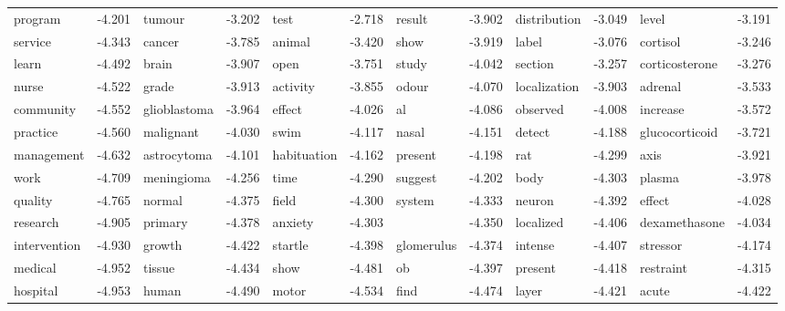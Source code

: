 \documentclass{article}
\begin{document}
\begin{table}
{\begin{tabular}{|l r|l r|l r|l r|l r|l r|}
program & -4.201 & tumour & -3.202 & test & -2.718 & result & -3.902 & distribution & -3.049 & level & -3.191\\
service & -4.343 & cancer & -3.785 & animal & -3.420 & show & -3.919 & label & -3.076 & cortisol & -3.246\\
learn & -4.492 & brain & -3.907 & open & -3.751 & study & -4.042 & section & -3.257 & corticosterone & -3.276\\
nurse & -4.522 & grade & -3.913 & activity & -3.855 & odour & -4.070 & localization & -3.903 & adrenal & -3.533\\
community & -4.552 & glioblastoma & -3.964 & effect & -4.026 & al & -4.086 & observed & -4.008 & increase & -3.572\\
practice & -4.560 & malignant & -4.030 & swim & -4.117 & nasal & -4.151 & detect & -4.188 & glucocorticoid & -3.721\\
management & -4.632 & astrocytoma & -4.101 & habituation & -4.162 & present & -4.198 & rat & -4.299 & axis & -3.921\\
work & -4.709 & meningioma & -4.256 & time & -4.290 & suggest & -4.202 & body & -4.303 & plasma & -3.978\\
quality & -4.765 & normal & -4.375 & field & -4.300 & system & -4.333 & neuron & -4.392 & effect & -4.028\\
research & -4.905 & primary & -4.378 & anxiety & -4.303 &  & -4.350 & localized & -4.406 & dexamethasone & -4.034\\
intervention & -4.930 & growth & -4.422 & startle & -4.398 & glomerulus & -4.374 & intense & -4.407 & stressor & -4.174\\
medical & -4.952 & tissue & -4.434 & show & -4.481 & ob & -4.397 & present & -4.418 & restraint & -4.315\\
hospital & -4.953 & human & -4.490 & motor & -4.534 & find & -4.474 & layer & -4.421 & acute & -4.422\\
\hline
\end{tabular}
}
\end{table}
\end{document}
